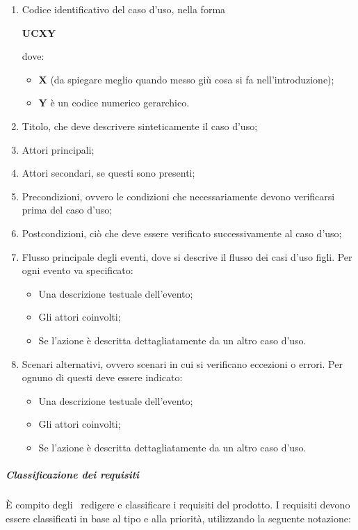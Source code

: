 \documentclass[../NormeProgetto.tex]{subfiles}
\begin{document}
				\begin{enumerate}
					\item Codice identificativo del caso d'uso, nella forma \begin{center}\textbf{UCXY}\end{center} dove:
					\begin{itemize}
						\item \textbf{X} (da spiegare meglio quando messo giù cosa si fa nell'introduzione);
						\item \textbf{Y} è un codice numerico gerarchico.
					\end{itemize}
					\item Titolo, che deve descrivere sinteticamente il caso d'uso;
					\item Attori principali;
					\item Attori secondari, se questi sono presenti;
					\item Precondizioni, ovvero le condizioni che necessariamente devono verificarsi prima del caso d'uso;
					\item Postcondizioni, ciò che deve essere verificato successivamente al caso d'uso;
					\item Flusso principale degli eventi, dove si descrive il flusso dei casi d'uso figli. Per ogni evento va specificato:
					\begin{itemize}
						\item Una descrizione testuale dell'evento;
						\item Gli attori coinvolti;
						\item Se l'azione è descritta dettagliatamente da un altro caso d'uso.
					\end{itemize}
					\item Scenari alternativi, ovvero scenari in cui si verificano eccezioni o errori. Per ognuno di questi deve essere indicato:
						\begin{itemize}
							\item Una descrizione testuale dell'evento;
							\item Gli attori coinvolti;
							\item Se l'azione è descritta dettagliatamente da un altro caso d'uso.
						\end{itemize}
				\end{enumerate}
				\subparagraph{Classificazione dei requisiti}
				È compito degli \analisti\ redigere e classificare i requisiti del prodotto.  I requisiti devono essere classificati in base al tipo e alla priorità, utilizzando la seguente notazione:
\end{document}

